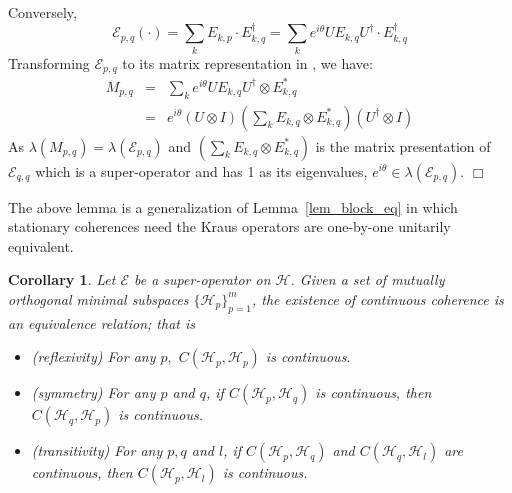 \documentclass[journal]{IEEEtran}
\def\h{\ensuremath{\mathcal{H}}}
\def\e{\ensuremath{\mathcal{E}}}
\newtheorem{corollary}{Corollary}
\begin{document}
Conversely, $$\e_{p,q}(\cdot)=\sum_{k}E_{k,p}\cdot E_{k,q}^\dagger=\sum_{k}e^{i\theta}UE_{k,q}U^\dagger\cdot E_{k,q}^\dagger$$ 
Transforming $\e_{p,q}$ to its matrix representation in \cite{guan2016decomposition}, we have:
\begin{eqnarray*}
  M_{p,q}&=&\sum_k e^{i\theta}UE_{k,q}U^\dagger\otimes E_{k,q}^{*}\\
  &=&e^{i\theta}(U\otimes I)(\sum_k E_{k,q}\otimes E_{k,q}^{*})(U^\dagger\otimes I)
\end{eqnarray*}
As $\lambda(M_{p,q})=\lambda(\e_{p,q})$ and $(\sum_k E_{k,q}\otimes E_{k,q}^{*})$ is the matrix presentation of $\e_{q,q}$ which is a super-operator and has 1 as its eigenvalues, $e^{i\theta}\in\lambda(\e_{p,q}).$  
\hfill $\Box$

The above lemma is a generalization of Lemma~\ref{lem_block_eq} in which stationary coherences need the Kraus operators are one-by-one unitarily equivalent. 
\begin{corollary}\label{cor_cc_eq}
Let $\e$ be a super-operator on $\h$. 
  Given a set of mutually orthogonal minimal subspaces $\{\h_p\}_{p=1}^{m}$, the existence of continuous coherence is an equivalence relation; that is \begin{itemize}
    \item [(1)] (reflexivity) For any $p,$ $C(\h_p,\h_p)$ is continuous.
    \item [(2)] (symmetry) For any $p$ and $q$, if $C(\h_p,\h_q)$ is continuous, then $C(\h_q,\h_p)$ is continuous.
    \item [(3)] (transitivity) For any $p,q$ and $l$, if $C(\h_p,\h_q)$ and $C(\h_q,\h_l)$ are continuous, then $C(\h_p,\h_l)$ is continuous.
      \end{itemize}
\end{corollary}
\end{document}
